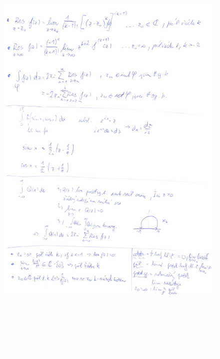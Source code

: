 \documentclass[a4]{report}
\theoremstyle{definition}
\begin{document}
\begin{figure}[H]
\includegraphics[width=\textwidth]{2-4c.jpg}
\end{figure}
\end{document}

